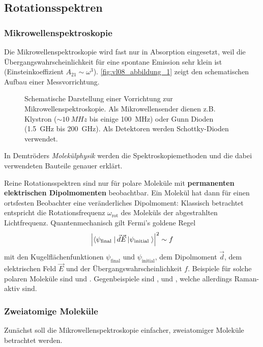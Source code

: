 \setcounter{section}{4}
\setcounter{subsection}{3}
\setcounter{equation}{14}
\subsection{Rotationsspektren}
\subsubsection{Mikrowellenspektroskopie}
	Die Mikrowellenspektroskopie wird fast nur in Absorption eingesetzt, weil die Übergangswahrscheinlichkeit für eine spontane Emission sehr klein ist (Einsteinkoeffizient $A_{21} \sim \omega^3$).
	\autoref{fig:vl08_abbildung_1} zeigt den schematischen Aufbau einer Messvorrichtung.
	\begin{figure}[H]
		\centering
		\caption{Schematische Darstellung einer Vorrichtung zur Mikrowellenspektroskopie. 
			Als Mikrowellensender dienen z.B. Klystron ($\sim\SI{10}{MHz}$ bis einige \SI{100}{MHz}) oder Gunn Dioden (\SI{1,5}{GHz} bis \SI{200}{GHz}).
			Als Detektoren werden Schottky-Dioden verwendet.
		}
		\label{fig:vl08_abbildung_1}
	\end{figure}

	\begin{verbal}
		In Demtröders \textit{Molekülphysik} werden die Spektroskopiemethoden und die dabei verwendeten Bauteile genauer erklärt.
	\end{verbal}

	Reine Rotationsspektren sind nur für polare Moleküle mit \textbf{permanenten elektrischen Dipolmomenten} beobachtbar.
	Ein Molekül hat dann für einen ortsfesten Beobachter eine veränderliches Dipolmoment: 
	Klassisch betrachtet entspricht die Rotationsfrequenz $\omega_\mathrm{rot}$ des Moleküls der abgestrahlten Lichtfrequenz.
	Quantenmechanisch gilt Fermi's goldene Regel
	$$
	\left| \bra{ \psi_{\text{final }}} \vec{d} \vec{E} \ket{ \psi_{\text{initial }}} \right|^2 \sim f    
	$$
	mit den Kugelflächenfunktionen $ \psi_{\text{final}}$ und $ \psi_{\text{initial}}$, dem Dipolmoment $ \vec{d}$, dem elektrischen Feld $\vec{E}$ und
	der Übergangswahrscheinlichkeit $f$. Beispiele für solche polaren Moleküle sind  und . Gegenbeispiele sind
	,  und , welche allerdings Raman-aktiv sind.

\subsubsection{Zweiatomige Moleküle}
	Zunächst soll die Mikrowellenspektroskopie einfacher, zweiatomiger Moleküle betrachtet werden. 
